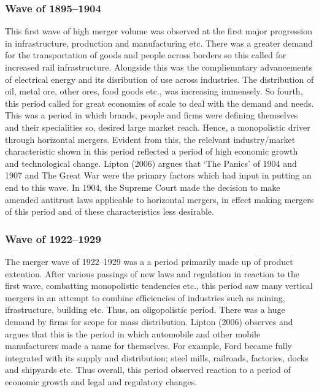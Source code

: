 \documentclass[11pt, english]{article}
\begin{document}
                \subsubsection*{Wave of 1895--1904}

        This first wave of high merger volume was observed at the first major progression in infrastructure, production and manufacturing etc. There was a greater demand for the transportation of goods and people across borders so this called for increased rail infrastructure. Alongside this was the compliemntary advancements of electrical energy and its disribution of use across industries. The distribution of oil, metal ore, other ores, food goods etc., was increasing immensely. So fourth, this period called for great economies of scale to deal with the demand and needs. This was a period in which brands, people and firms were defining themselves and their specialities so, desired large market reach. Hence, a monopolistic driver through horizontal mergers. Evident from this, the relelvant industry/market characteristic shown in this period reflected a period of high economic growth and technological change. Lipton (2006) argues that `The Panics' of 1904 and 1907 and The Great War were the primary factors which had input in putting an end to this wave. In 1904, the Supreme Court made the decision to make amended antitrust laws applicable to horizontal mergers, in effect making mergers of this period and of these characteristics less desirable.

                \subsubsection*{Wave of 1922--1929}

        The merger wave of 1922--1929 was a a period primarily made up of product extention. After various passings of new laws and regulation in reaction to the first wave, combatting monopolistic tendencies etc., this period saw many vertical mergers in an attempt to combine efficiencies of industries such as mining, ifrastructure, building etc. Thus, an oligopolistic period. There was a huge demand by firms for scope for mass distribution. Lipton (2006) observes and argues that this is the period in which automobile and other mobile manufacturers made a name for themselves. For example, Ford became fully integrated with its supply and distribution; steel mills, railroads, factories, docks and shipyards etc. Thus overall, this period observed reaction to a period of economic growth and legal and regulatory changes.
\end{document}
